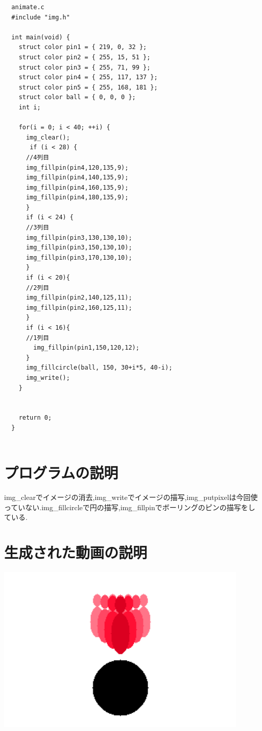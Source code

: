 \documentclass[12pt,a4j]{jarticle}
\begin{document}
\begin{verbatim}
  animate.c
  #include "img.h"

  int main(void) {
    struct color pin1 = { 219, 0, 32 };
    struct color pin2 = { 255, 15, 51 };
    struct color pin3 = { 255, 71, 99 };
    struct color pin4 = { 255, 117, 137 };
    struct color pin5 = { 255, 168, 181 };
    struct color ball = { 0, 0, 0 };
    int i;
  
    for(i = 0; i < 40; ++i) {
      img_clear();
       if (i < 28) {
      //4列目
      img_fillpin(pin4,120,135,9);
      img_fillpin(pin4,140,135,9);
      img_fillpin(pin4,160,135,9);
      img_fillpin(pin4,180,135,9);
      }
      if (i < 24) {
      //3列目
      img_fillpin(pin3,130,130,10);
      img_fillpin(pin3,150,130,10);
      img_fillpin(pin3,170,130,10);
      }
      if (i < 20){
      //2列目
      img_fillpin(pin2,140,125,11);
      img_fillpin(pin2,160,125,11);
      }
      if (i < 16){
      //1列目
        img_fillpin(pin1,150,120,12);
      }
      img_fillcircle(ball, 150, 30+i*5, 40-i); 
      img_write();
    }
  
  
    return 0;
  }


\end{verbatim}

\section{プログラムの説明}

img\_clearでイメージの消去,img\_writeでイメージの描写,img\_putpixelは今回使っていない.img\_fillcircleで円の描写,img\_fillpinでボーリングのピンの描写をしている.

\section{生成された動画の説明}


\begin{center}
\includegraphics[width=12cm]{img-4.png}
\end{center}
\end{document}
